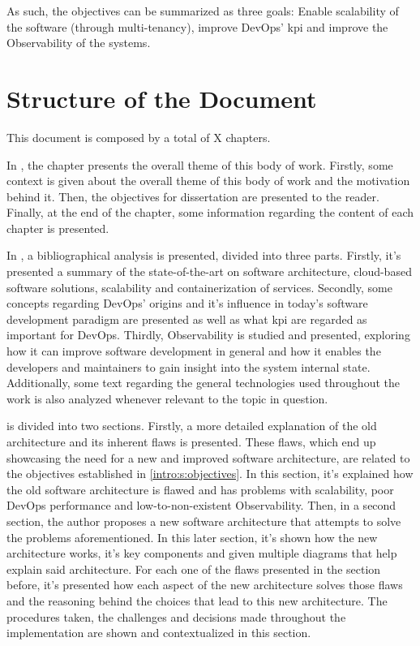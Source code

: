 As such, the objectives can be summarized as three goals: Enable scalability of the software (through multi-tenancy), improve DevOps' \gls{kpi} and improve the Observability of the systems.


\section{Structure of the Document}\label{intro:s:structure-of-the-document}

This document is composed by a total of X chapters.

In , the chapter presents the overall theme of this body of work. Firstly, some context is given about the overall theme of this body of work and the motivation behind it. Then, the objectives for dissertation are presented to the reader. Finally, at the end of the chapter, some information regarding the content of each chapter is presented.

In , a bibliographical analysis is presented, divided into three parts. Firstly, it's presented a summary of the state-of-the-art on software architecture, cloud-based software solutions, scalability and containerization of services. Secondly, some concepts regarding DevOps' origins and it's influence in today's software development paradigm are presented as well as what \gls{kpi} are regarded as important for DevOps. Thirdly, Observability is studied and presented, exploring how it can improve software development in general and how it enables the developers and maintainers to gain insight into the system internal state. Additionally, some text regarding the general technologies used throughout the work is also analyzed whenever relevant to the topic in question.

 is divided into two sections. Firstly, a more detailed explanation of the old architecture and its inherent flaws is presented. These flaws, which end up showcasing the need for a new and improved software architecture, are related to the objectives established in \cref{intro:s:objectives}. In this section, it's explained how the old software architecture is flawed and has problems with scalability, poor DevOps performance and low-to-non-existent Observability. Then, in a second section, the author proposes a new software architecture that attempts to solve the problems aforementioned. In this later section, it's shown how the new architecture works, it's key components and given multiple diagrams that help explain said architecture. For each one of the flaws presented in the section before, it's presented how each aspect of the new architecture solves those flaws and the reasoning behind the choices that lead to this new architecture. The procedures taken, the challenges and decisions made throughout the implementation are shown and contextualized in this section.

